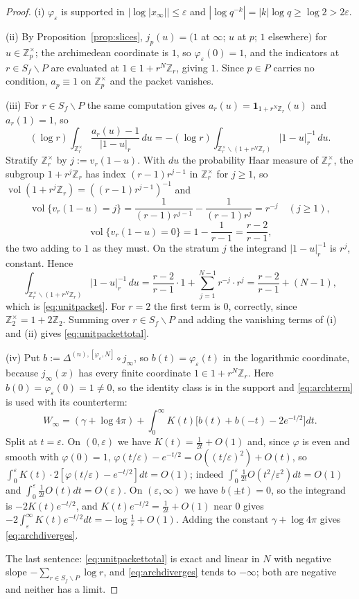 \documentclass[11pt]{amsart}
\theoremstyle{definition}
\theoremstyle{remark}
\newcommand{\Z}{\mathbb Z}
\newcommand{\vol}{\operatorname{vol}}
\begin{document}
\begin{proof}
(i) $\varphi_\varepsilon$ is supported in $|\log|x_\infty||\le\varepsilon$ and
$|\log q^{-k}|=|k|\log q\ge\log2>2\varepsilon$.

(ii) By Proposition~\ref{prop:slices}, $j_p(u)=(1$ at $\infty$; $u$ at $p$; $1$
elsewhere$)$ for $u\in\Z_p^\times$; the archimedean coordinate is $1$, so
$\varphi_\varepsilon(0)=1$, and the indicators at $r\in S_f\smallsetminus P$
are evaluated at $1\in1+r^N\Z_r$, giving $1$. Since $p\in P$ carries no
condition, $a_p\equiv1$ on $\Z_p^\times$ and the packet vanishes.

(iii) For $r\in S_f\smallsetminus P$ the same computation gives
$a_r(u)=\mathbf 1_{1+r^N\Z_r}(u)$ and $a_r(1)=1$, so
\[
  (\log r)\int_{\Z_r^\times}\frac{a_r(u)-1}{|1-u|_r}\,du
   =-(\log r)\int_{\Z_r^\times\smallsetminus(1+r^N\Z_r)}|1-u|_r^{-1}\,du .
\]
Stratify $\Z_r^\times$ by $j:=v_r(1-u)$. With $du$ the probability Haar measure
of $\Z_r^\times$, the subgroup $1+r^j\Z_r$ has index $(r-1)r^{j-1}$ in
$\Z_r^\times$ for $j\ge1$, so $\vol(1+r^j\Z_r)=((r-1)r^{j-1})^{-1}$ and
\[
  \vol\{v_r(1-u)=j\}=\frac{1}{(r-1)r^{j-1}}-\frac{1}{(r-1)r^{j}}=r^{-j}
   \quad(j\ge1),
\]
\[
  \vol\{v_r(1-u)=0\}=1-\frac{1}{r-1}=\frac{r-2}{r-1},
\]
the two adding to $1$ as they must. On the stratum $j$ the integrand
$|1-u|_r^{-1}$ is $r^j$, constant. Hence
\[
  \int_{\Z_r^\times\smallsetminus(1+r^N\Z_r)}|1-u|_r^{-1}\,du
   =\frac{r-2}{r-1}\cdot1+\sum_{j=1}^{N-1}r^{-j}\cdot r^{j}
   =\frac{r-2}{r-1}+(N-1),
\]
which is \eqref{eq:unitpacket}. For $r=2$ the first term is $0$, correctly,
since $\Z_2^\times=1+2\Z_2$. Summing over $r\in S_f\smallsetminus P$ and adding
the vanishing terms of (i) and (ii) gives \eqref{eq:unitpackettotal}.

(iv) Put $b:=\Delta^{(n),[\varphi_\varepsilon,N]}\circ j_\infty$, so
$b(t)=\varphi_\varepsilon(t)$ in the logarithmic coordinate, because
$j_\infty(x)$ has every finite coordinate $1\in1+r^N\Z_r$. Here
$b(0)=\varphi_\varepsilon(0)=1\ne0$, so the identity class is in the support
and \eqref{eq:archterm} is used with its counterterm:
\[
  W_\infty=(\gamma+\log4\pi)+\int_0^\infty K(t)
    \bigl[b(t)+b(-t)-2e^{-t/2}\bigr]dt .
\]
Split at $t=\varepsilon$. On $(0,\varepsilon)$ we have
$K(t)=\tfrac1{2t}+O(1)$ and, since $\varphi$ is even and smooth with
$\varphi(0)=1$, $\varphi(t/\varepsilon)-e^{-t/2}=O((t/\varepsilon)^2)+O(t)$, so
$\int_0^\varepsilon K(t)\cdot2[\varphi(t/\varepsilon)-e^{-t/2}]dt=O(1)$; indeed
$\int_0^\varepsilon\tfrac1{2t}O(t^2/\varepsilon^2)dt=O(1)$ and
$\int_0^\varepsilon\tfrac1{2t}O(t)dt=O(\varepsilon)$. On $(\varepsilon,\infty)$
we have $b(\pm t)=0$, so the integrand is $-2K(t)e^{-t/2}$, and
$K(t)e^{-t/2}=\tfrac1{2t}+O(1)$ near $0$ gives
$-2\int_\varepsilon^\infty K(t)e^{-t/2}dt=-\log\tfrac1\varepsilon+O(1)$. Adding
the constant $\gamma+\log4\pi$ gives \eqref{eq:archdiverges}.

The last sentence: \eqref{eq:unitpackettotal} is exact and linear in $N$ with
negative slope $-\sum_{r\in S_f\smallsetminus P}\log r$, and
\eqref{eq:archdiverges} tends to $-\infty$; both are negative and neither has a
limit.
\end{proof}
\end{document}
